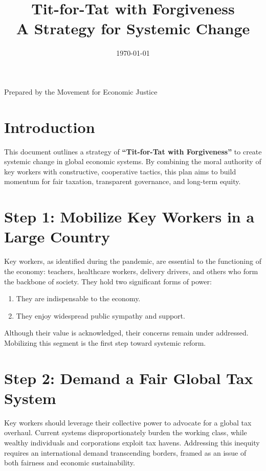 \documentclass[11pt,a4paper]{article}
\title{\Huge Tit-for-Tat with Forgiveness\\[0.5em]\Large A Strategy for Systemic Change}
\author{}
\date{\today}
\begin{document}
\maketitle
\thispagestyle{empty}

\vfill

\begin{center}
  {\Large Prepared by the Movement for Economic Justice}
\end{center}

\clearpage
\tableofcontents
\clearpage

\section{Introduction}
This document outlines a strategy of \textbf{``Tit-for-Tat with Forgiveness''} to create systemic change in global economic systems. By combining the moral authority of key workers with constructive, cooperative tactics, this plan aims to build momentum for fair taxation, transparent governance, and long-term equity.

\section{Step 1: Mobilize Key Workers in a Large Country}
Key workers, as identified during the pandemic, are essential to the functioning of the economy: teachers, healthcare workers, delivery drivers, and others who form the backbone of society. They hold two significant forms of power:
\begin{enumerate}
  \item They are indispensable to the economy.
  \item They enjoy widespread public sympathy and support.
\end{enumerate}
Although their value is acknowledged, their concerns remain under addressed. Mobilizing this segment is the first step toward systemic reform.

\section{Step 2: Demand a Fair Global Tax System}
Key workers should leverage their collective power to advocate for a global tax overhaul. Current systems disproportionately burden the working class, while wealthy individuals and corporations exploit tax havens. Addressing this inequity requires an international demand transcending borders, framed as an issue of both fairness and economic sustainability.
\end{document}
